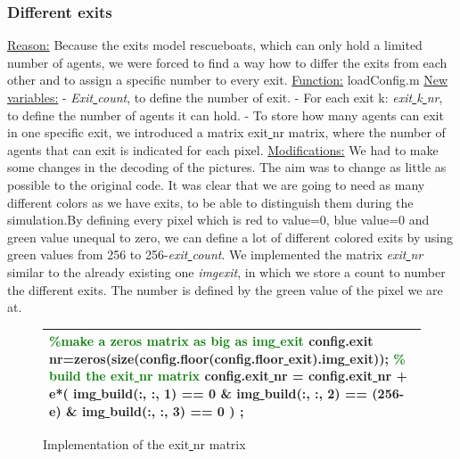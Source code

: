 \documentclass[11pt]{article}
\begin{document}
\subsubsection{Different exits}
\underline{Reason:}
\newline
Because the exits model rescueboats, which can only hold a limited number of agents, we were forced to find a way how to differ the exits from each other and to assign a specific number to every exit.
\newline
\underline{Function:}
\newline
loadConfig.m
\newline
\underline{New variables:}
\newline
- \textit{Exit\underline{ }count}, to define the number of exit.\newline
- For each exit k: \textit{exit\underline{ }k\underline{ }nr}, to define the number of agents it can hold.\newline
- To store how many agents can exit in one specific exit, we introduced a matrix exit\underline{ }nr matrix, where the number of agents that can exit is indicated for each pixel.
\underline{Modifications:}
\newline 
We had to make some changes in the decoding of the pictures. The aim was to change as little as possible to the original code. It was clear that we are going to need as many different colors as we have exits, to be able to distinguish them during the simulation.By defining every pixel which is red to value=0, blue value=0 and green value unequal to zero, we can define a lot of different colored exits by using green values from 256 to 256-\textit{exit\underline{ }count}.
\newline
We implemented the matrix \textit{exit\underline{ }nr} similar to the already existing one \textit{img\underline{}exit}, in which we store a count to number the different exits. The number is defined by the green value of  the pixel we are at.

\begin{figure}[h]
\centering
\begin{tabular}
{|>{\large}m{\textwidth}|} \hline
\bigskip
\textcolor{green}{\%make a zeros matrix as big as img\underline{ }exit}
\newline
config.exit\underline{ }nr=zeros(size(config.floor(config.floor\underline{ }exit).img\underline{ }exit));
\newline
\textcolor{green}{\% build the exit\underline{ }nr matrix}
\newline
config.exit\underline{ }nr = config.exit\underline{ }nr + e*( img\underline{ }build(:, :, 1) == 0 \& img\underline{ }build(:, :, 2) == (256-e) \& img\underline{ }build(:, :, 3) == 0 ) ;
\bigskip
\\ \hline
\end{tabular}
\caption{Implementation of the exit\underline{ }nr matrix}
\end{figure}
\end{document}
